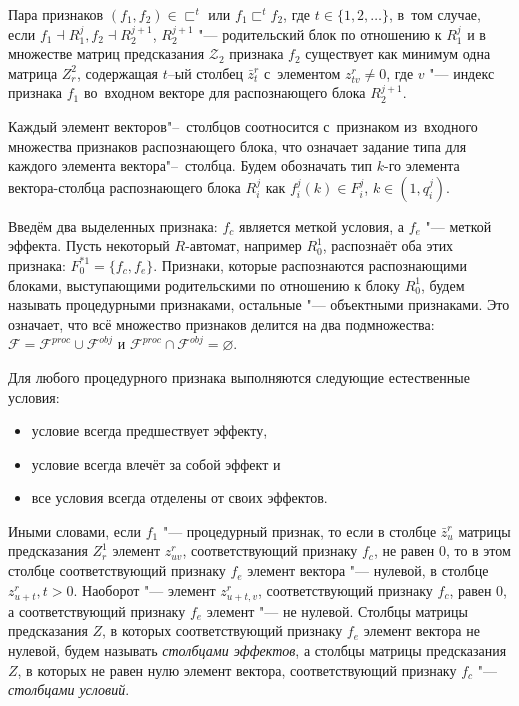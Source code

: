 \documentclass[a4paper, 12pt]{article}
\theoremstyle{plain}
\begin{document}
		Пара признаков $(f_1,f_2)\in\sqsubset^t$ или $f_1\sqsubset^t f_2$, где $t\in\{1,2,\dots\}$, в~том случае, если $f_1\dashv R_1^j, f_2\dashv R_2^{j+1}$, $R_2^{j+1}$ "--- родительский блок по отношению к $R_1^j$ и в множестве матриц предсказания $\mathcal Z_2$ признака $f_2$ существует как минимум одна матрица $Z_r^2$, содержащая $t$–ый столбец $\bar z_t^r$ с~элементом $z_{tv}^r\not=0$, где $v$ "--- индекс признака $f_1$ во~входном векторе для распознающего блока $R_2^{j+1}$.
		
		Каждый элемент векторов"--~столбцов соотносится с~признаком из~входного множества признаков распознающего блока, что означает задание типа для каждого элемента вектора"--~столбца. Будем обозначать тип $k$-го элемента вектора-столбца распознающего блока $R_i^j$ как $f_i^j(k)\in F_i^j$, $k\in(1,q_i^j)$. 
		
		Введём два выделенных признака: $f_c$ является меткой условия, а $f_e$ "--- меткой эффекта. Пусть некоторый $R$-автомат, например $R_0^1$, распознаёт оба этих признака: $F_0^{*1}=\{f_c,f_e\}$. Признаки, которые распознаются распознающими блоками, выступающими родительскими по отношению к блоку $R_0^1$, будем называть процедурными признаками, остальные "--- объектными признаками. Это означает, что всё множество признаков делится на два подмножества: $\mathcal F=\mathcal F^{proc}\cup\mathcal F^{obj}$ и $\mathcal F^{proc}\cap\mathcal F^{obj}=\varnothing$.
		
		Для любого процедурного признака выполняются следующие естественные условия:
		\begin{itemize}
			\item условие всегда предшествует эффекту,
			\item условие всегда влечёт за собой эффект и
			\item все условия всегда отделены от своих эффектов.
		\end{itemize}
		
		Иными словами, если $f_1$ "--- процедурный признак, то если в столбце $\bar z_u^r$ матрицы предсказания $Z_r^1$ элемент $z_{uv}^r$, соответствующий признаку $f_c$, не равен $0$, то в этом столбце соответствующий признаку $f_e$ элемент вектора "--- нулевой, в столбце $z_{u+t}^r, t>0$. Наоборот "--- элемент $z_{u+t,v}^r$, соответствующий признаку $f_c$, равен $0$, а соответствующий признаку $f_e$ элемент "--- не нулевой. Столбцы матрицы предсказания $Z$, в которых соответствующий признаку $f_e$ элемент вектора не нулевой, будем называть \textit{столбцами эффектов}, а столбцы матрицы предсказания $Z$, в которых не равен нулю элемент вектора, соответствующий признаку $f_c$ "--- \textit{столбцами условий}. 
		
\end{document}
